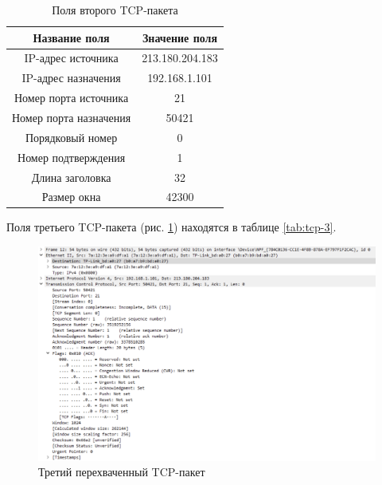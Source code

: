 \documentclass[a4paper, 14pt]{extarticle}
\begin{document}
\begin{table}[H]
  \caption{Поля второго TCP-пакета}
  \label{tab:tcp-2}

  \centering
  \renewcommand*{\arraystretch}{1.2}
  \setlength{\tabcolsep}{12pt}

  \begin{tabular}{|c|c|}
    \hline
    \textbf{Название поля} & \textbf{Значение поля} \\
    \hline
    IP-адрес источника & 213.180.204.183 \\
    \hline
    IP-адрес назначения & 192.168.1.101 \\
    \hline
    Номер порта источника & 21 \\
    \hline
    Номер порта назначения & 50421 \\
    \hline
    Порядковый номер & 0 \\
    \hline
    Номер подтверждения & 1 \\
    \hline
    Длина заголовка & 32 \\
    \hline
    Размер окна & 42300 \\
    \hline
  \end{tabular}
\end{table}

Поля третьего TCP-пакета (рис. \ref{fig:tcp-3}) находятся в таблице
\ref{tab:tcp-3}.

\begin{figure}[H]
  \centering
  \includegraphics[width=\textwidth]{images/tcp-3.png}
  \caption{Третий перехваченный TCP-пакет}
  \label{fig:tcp-3}
\end{figure}
\end{document}
